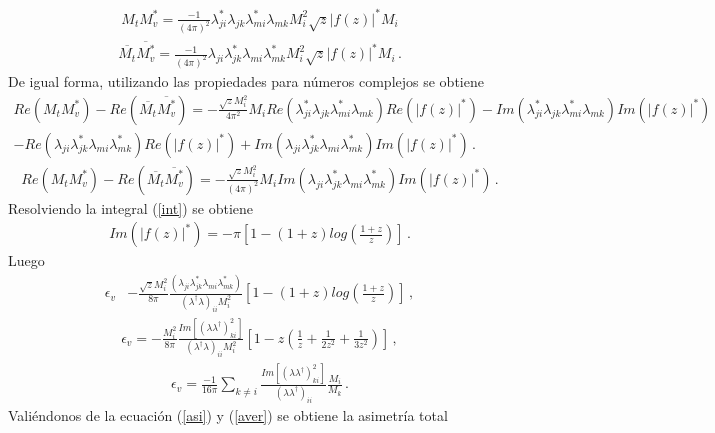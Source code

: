  \begin{align}
 M_{t}M_{v}^*=\frac{-1}{(4\pi)^2}\lambda^*_{ji}\lambda_{jk}\lambda^*_{mi}\lambda_{mk}M^2_{i}\sqrt{z}|f(z)|^*M_{i}
 \end{align}
  \begin{align}
 \overline{M_{t}}\overline{M_{v}^*}=\frac{-1}{(4\pi)^2}\lambda_{ji}\lambda^*_{jk}\lambda_{mi}\lambda^*_{mk}M^2_{i}\sqrt{z}|f(z)|^*M_{i}\, .
 \end{align}
 De igual forma, utilizando las propiedades para números complejos se obtiene
 \begin{align}
 Re( M_{t}M_{v}^*)-Re(\overline{M_{t}}\overline{M_{v}^*})=-\frac{\sqrt{z}M_{i}^2}{4\pi^2}M_{i}Re(\lambda^*_{ji}\lambda_{jk}\lambda^*_{mi}\lambda_{mk})Re(|f(z)|^*)-Im(\lambda^*_{ji}\lambda_{jk}\lambda^*_{mi}\lambda_{mk})Im(|f(z)|^*)\nonumber\\-Re(\lambda_{ji}\lambda^*_{jk}\lambda_{mi}\lambda^*_{mk})Re(|f(z)|^*)+Im(\lambda_{ji}\lambda^*_{jk}\lambda_{mi}\lambda^*_{mk})Im(|f(z)|^*)\, . 
 \end{align}
  \begin{align}
  Re( M_{t}M_{v}^*)-Re(\overline{M_{t}}\overline{M_{v}^*})=-\frac{\sqrt{z}M_{i}^2}{(4\pi)^2}M_{i}Im(\lambda_{ji}\lambda^*_{jk}\lambda_{mi}\lambda^*_{mk})Im(|f(z)|^*)\, .
 \end{align}
 Resolviendo la integral (\ref{int}) se obtiene
 \begin{align}
  Im(|f(z)|^*)=-\pi\left[1-(1+z)log\left(\frac{1+z}{z}\right)\right]\, .	
 \end{align}
Luego 
\begin{align}
\epsilon_{v}&-\frac{\sqrt{z}M_{i}^2}{8\pi}\frac{(\lambda_{ji}\lambda^*_{jk}\lambda_{mi}\lambda^*_{mk})}{(\lambda^{\dagger}\lambda)_{ii}M_{i}^2}\left[1-(1+z)log\left(\frac{1+z}{z}\right)\right]\, ,
\end{align}
\begin{align}
\epsilon_{v}=-\frac{M_{i}^2}{8\pi}\frac{Im[({\lambda\lambda^\dagger})_{ki}^2]}{(\lambda^{\dagger}\lambda)_{ii}M_{i}^2}\left[1-z\left(\frac{1}{z}+\frac{1}{2z^2}+\frac{1}{3z^2}\right)\right]\, ,
\end{align}
\begin{align}
\label{aver}
\epsilon_{v}=\frac{-1}{16\pi}\sum_{k\not=i}\frac{Im[({\lambda\lambda^\dagger})_{ki}^2]}{{(\lambda\lambda^\dagger)}_{ii}}\frac{M_i}{M_k}\, .
\end{align}
Valiéndonos de la ecuación (\ref{asi}) y (\ref{aver}) se obtiene la asimetría total
